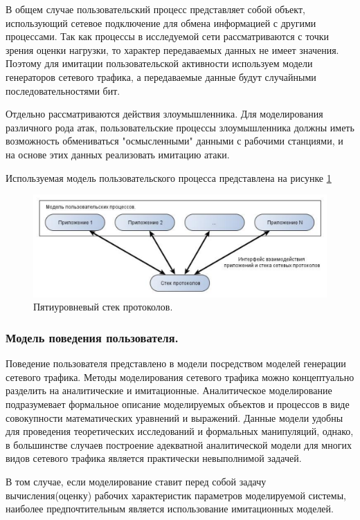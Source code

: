 \documentclass[12pt]{report}
\begin{document}
    В общем случае пользовательский процесс представляет собой объект, использующий сетевое подключение для обмена информацией с другими процессами. Так как процессы в исследуемой сети рассматриваются с точки зрения оценки нагрузки, то характер передаваемых данных не имеет значения. Поэтому для имитации пользовательской активности используем модели генераторов сетевого трафика, а передаваемые данные будут случайными последовательностями бит.

    Отдельно рассматриваются действия злоумышленника. Для моделирования различного рода атак, пользовательские процессы злоумышленника должны иметь возможность обмениваться "осмысленными" данными с рабочими станциями, и на основе этих данных реализовать имитацию атаки.

    Используемая модель пользовательского процесса представлена на рисунке \ref{Pic10}

    \begin{figure}\center
        \includegraphics[width = 120mm]{Ch2Pic10}
        \caption{Пятиуровневый стек протоколов.} \label{Pic10}
    \end{figure}

    \subsubsection{Модель поведения пользователя. }

    Поведение пользователя представлено в модели посредством моделей генерации сетевого трафика. Методы моделирования сетевого трафика можно концептуально разделить на аналитические и имитационные. Аналитическое моделирование подразумевает формальное описание моделируемых объектов и процессов в виде совокупности математических уравнений и выражений. Данные модели удобны для проведения теоретических исследований и формальных манипуляций, однако, в большинстве случаев построение адекватной аналитической модели для многих видов сетевого трафика является практически невыполнимой задачей.

    В том случае, если моделирование ставит перед собой задачу вычисления(оценку) рабочих характеристик параметров моделируемой системы, наиболее предпочтительным является использование имитационных моделей.
\end{document}
